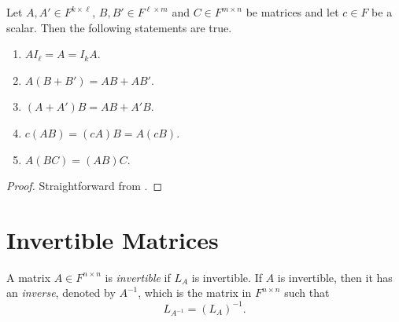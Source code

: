 \begin{theorem}
  \label{thm:composition}
  Let $A, A' \in F^{k \times \ell}$, $B, B' \in F^{\ell \times m}$ and
  $C \in F^{m \times n}$ be matrices and let $c \in F$ be a scalar.
  Then the following statements are true.
  \begin{enumerate}
    \item $AI_\ell = A = I_kA$.
    \item $A(B + B') = AB + AB'$.
    \item $(A + A')B = AB + A'B$.
    \item $c(AB) = (cA)B = A(cB)$.
    \item $A(BC) = (AB)C$.
  \end{enumerate}
\end{theorem}
\begin{proof}
  Straightforward from .
\end{proof}

\section{Invertible Matrices}
\begin{definition}
  \label{def:invertible-matrix}
  A matrix $A \in F^{n \times n}$ is \emph{invertible} if $L_A$ is invertible.
  If $A$ is invertible, then it has an \emph{inverse}, denoted by $A^{-1}$,
  which is the matrix in $F^{n \times n}$ such that
  \begin{equation*}
    L_{A^{-1}} = (L_A)^{-1}.
  \end{equation*}
\end{definition}

